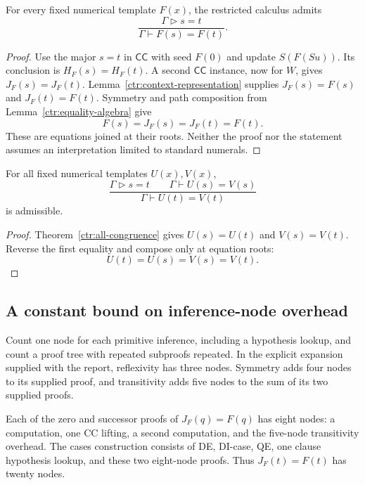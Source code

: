 \begin{theorem}
\label{ctr:all-congruence}
For every fixed numerical template $F(x)$, the restricted calculus admits
\[
 \frac{\Gamma\mathrel{\triangleright}s=t}
      {\Gamma\vdash F(s)=F(t)}.
 \tag{Numerical congruence}
\]
\end{theorem}
\begin{proof}
Use the major $s=t$ in $\mathsf{CC}$ with seed $F(0)$ and update
$S(F(Su))$. Its conclusion is $H_F(s)=H_F(t)$. A second
$\mathsf{CC}$ instance, now for $W$, gives
$J_F(s)=J_F(t)$. Lemma~\ref{ctr:context-representation} supplies
$J_F(s)=F(s)$ and $J_F(t)=F(t)$. Symmetry and path composition from
Lemma~\ref{ctr:equality-algebra} give
\[
                F(s)=J_F(s)=J_F(t)=F(t).
\]
These are equations joined at their roots. Neither the proof nor the
statement assumes an interpretation limited to standard numerals.
\end{proof}

\begin{corollary}
\label{ctr:atomic-transport}
For all fixed numerical templates $U(x),V(x)$,
\[
 \frac{\Gamma\mathrel{\triangleright}s=t\qquad
       \Gamma\vdash U(s)=V(s)}
      {\Gamma\vdash U(t)=V(t)}
 \tag{Atomic transport}
\]
is admissible.
\end{corollary}
\begin{proof}
Theorem~\ref{ctr:all-congruence} gives $U(s)=U(t)$ and $V(s)=V(t)$.
Reverse the first equality and compose only at equation roots:
\[
                U(t)=U(s)=V(s)=V(t).
\]
\end{proof}

\subsection{A constant bound on inference-node overhead}

Count one node for each primitive inference, including a hypothesis
lookup, and count a proof tree with repeated subproofs repeated. In the
explicit expansion supplied with the report, reflexivity has three
nodes. Symmetry adds four nodes to its supplied proof, and transitivity
adds five nodes to the sum of its two supplied proofs.

Each of the zero and successor proofs of $J_F(q)=F(q)$ has eight
nodes: a computation, one CC lifting, a second computation, and the
five-node transitivity overhead. The cases construction consists of
DE, DI-case, QE, one clause hypothesis lookup, and these two eight-node
proofs. Thus $J_F(t)=F(t)$ has twenty nodes.

